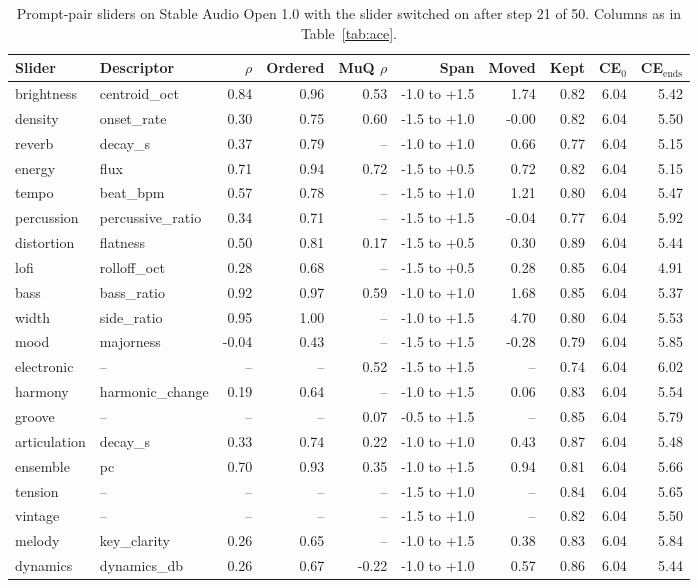 \begin{table}[t]\centering\small
\begin{tabular}{llrrrrrrrr}
\toprule
Slider & Descriptor & $\rho$ & Ordered & MuQ $\rho$ & Span & Moved & Kept & CE$_0$ & CE$_\text{ends}$ \\
\midrule
brightness & centroid\_oct & 0.84 & 0.96 & 0.53 & -1.0 to +1.5 & 1.74 & 0.82 & 6.04 & 5.42 \\
density & onset\_rate & 0.30 & 0.75 & 0.60 & -1.5 to +1.0 & -0.00 & 0.82 & 6.04 & 5.50 \\
reverb & decay\_s & 0.37 & 0.79 & -- & -1.0 to +1.0 & 0.66 & 0.77 & 6.04 & 5.15 \\
energy & flux & 0.71 & 0.94 & 0.72 & -1.5 to +0.5 & 0.72 & 0.82 & 6.04 & 5.15 \\
tempo & beat\_bpm & 0.57 & 0.78 & -- & -1.5 to +1.0 & 1.21 & 0.80 & 6.04 & 5.47 \\
percussion & percussive\_ratio & 0.34 & 0.71 & -- & -1.5 to +1.5 & -0.04 & 0.77 & 6.04 & 5.92 \\
distortion & flatness & 0.50 & 0.81 & 0.17 & -1.5 to +0.5 & 0.30 & 0.89 & 6.04 & 5.44 \\
lofi & rolloff\_oct & 0.28 & 0.68 & -- & -1.5 to +0.5 & 0.28 & 0.85 & 6.04 & 4.91 \\
bass & bass\_ratio & 0.92 & 0.97 & 0.59 & -1.0 to +1.0 & 1.68 & 0.85 & 6.04 & 5.37 \\
width & side\_ratio & 0.95 & 1.00 & -- & -1.0 to +1.5 & 4.70 & 0.80 & 6.04 & 5.53 \\
mood & majorness & -0.04 & 0.43 & -- & -1.5 to +1.5 & -0.28 & 0.79 & 6.04 & 5.85 \\
electronic & -- & -- & -- & 0.52 & -1.5 to +1.5 & -- & 0.74 & 6.04 & 6.02 \\
harmony & harmonic\_change & 0.19 & 0.64 & -- & -1.0 to +1.5 & 0.06 & 0.83 & 6.04 & 5.54 \\
groove & -- & -- & -- & 0.07 & -0.5 to +1.5 & -- & 0.85 & 6.04 & 5.79 \\
articulation & decay\_s & 0.33 & 0.74 & 0.22 & -1.0 to +1.0 & 0.43 & 0.87 & 6.04 & 5.48 \\
ensemble & pc & 0.70 & 0.93 & 0.35 & -1.0 to +1.5 & 0.94 & 0.81 & 6.04 & 5.66 \\
tension & -- & -- & -- & -- & -1.5 to +1.0 & -- & 0.84 & 6.04 & 5.65 \\
vintage & -- & -- & -- & -- & -1.5 to +1.0 & -- & 0.82 & 6.04 & 5.50 \\
melody & key\_clarity & 0.26 & 0.65 & -- & -1.0 to +1.5 & 0.38 & 0.83 & 6.04 & 5.84 \\
dynamics & dynamics\_db & 0.26 & 0.67 & -0.22 & -1.0 to +1.0 & 0.57 & 0.86 & 6.04 & 5.44 \\
\bottomrule
\end{tabular}
\caption{Prompt-pair sliders on Stable Audio Open 1.0 with the slider switched on after step 21 of 50. Columns as in Table~\ref{tab:ace}.}\label{tab:sao}
\end{table}
